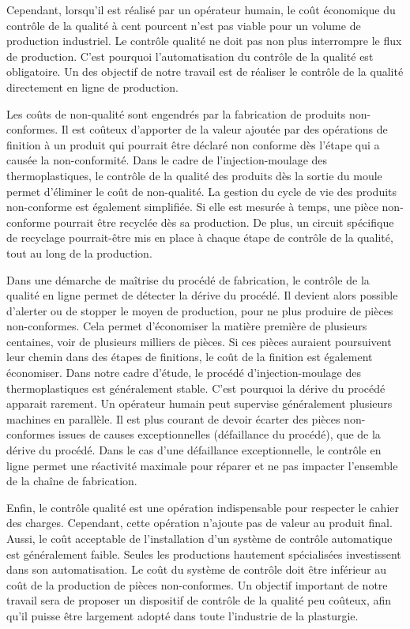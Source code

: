 Cependant, lorsqu'il est réalisé par un opérateur humain, le coût économique du contrôle de la qualité à cent pourcent n'est pas viable pour un volume de production industriel.
Le contrôle qualité ne doit pas non plus interrompre le flux de production.
C'est pourquoi l'automatisation du contrôle de la qualité est obligatoire.
Un des objectif de notre travail est de réaliser le contrôle de la qualité directement en ligne de production.

Les coûts de non-qualité sont engendrés par la fabrication de produits non-conformes.
Il est coûteux d'apporter de la valeur ajoutée par des opérations de finition à un produit qui pourrait être déclaré non conforme dès l'étape qui a causée la non-conformité.
Dans le cadre de l'injection-moulage des thermoplastiques, le contrôle de la qualité des produits dès la sortie du moule permet d'éliminer le coût de non-qualité.
La gestion du cycle de vie des produits non-conforme est également simplifiée.
Si elle est mesurée à temps, une pièce non-conforme pourrait être recyclée dès sa production.
De plus, un circuit spécifique de recyclage pourrait-être mis en place à chaque étape de contrôle de la qualité, tout au long de la production.

Dans une démarche de maîtrise du procédé de fabrication, le contrôle de la qualité en ligne permet de détecter la dérive du procédé.
Il devient alors possible d'alerter ou de stopper le moyen de production, pour ne plus produire de pièces non-conformes.
Cela permet d'économiser la matière première de plusieurs centaines, voir de plusieurs milliers de pièces.
Si ces pièces auraient poursuivent leur chemin dans des étapes de finitions, le coût de la finition est également économiser.
Dans notre cadre d'étude, le procédé d'injection-moulage des thermoplastiques est généralement stable.
C'est pourquoi la dérive du procédé apparait rarement.
Un opérateur humain peut supervise généralement plusieurs machines en parallèle.
Il est plus courant de devoir écarter des pièces non-conformes issues de causes exceptionnelles (défaillance du procédé), que de la dérive du procédé.
Dans le cas d'une défaillance exceptionnelle, le contrôle en ligne permet une réactivité maximale pour réparer et ne pas impacter l'ensemble de la chaîne de fabrication.

Enfin, le contrôle qualité est une opération indispensable pour respecter le cahier des charges.
Cependant, cette opération n'ajoute pas de valeur au produit final.
Aussi, le coût acceptable de l'installation d'un système de contrôle automatique est généralement faible.
Seules les productions hautement spécialisées investissent dans son automatisation.
Le coût du système de contrôle doit être inférieur au coût de la production de pièces non-conformes.
Un objectif important de notre travail sera de proposer un dispositif de contrôle de la qualité peu coûteux, afin qu'il puisse être largement adopté dans toute l'industrie de la plasturgie.

